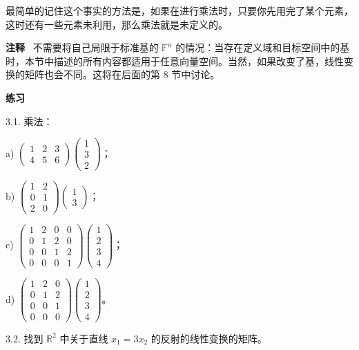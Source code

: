 最简单的记住这个事实的方法是，如果在进行乘法时，只要你先用完了某个元素，这时还有一些元素未利用，那么乘法就是未定义的。

\textbf{注释}~ 不需要将自己局限于标准基的 $\mathbb{F}^n$ 的情况：当存在定义域和目标空间中的基时，本节中描述的所有内容都适用于任意向量空间。当然，如果改变了基，线性变换的矩阵也会不同。这将在后面的第 8 节中讨论。


\textbf{练习}~

3.1. 乘法：

a) $\begin{pmatrix} 1 & 2 & 3 \\ 4 & 5 & 6 \end{pmatrix} \begin{pmatrix} 1 \\ 3 \\ 2 \end{pmatrix}$；

b) $\begin{pmatrix} 1 & 2 \\ 0 & 1 \\ 2 & 0 \end{pmatrix} \begin{pmatrix} 1 \\ 3 \end{pmatrix}$；

c) $\begin{pmatrix} 1 & 2 & 0 & 0 \\ 0 & 1 & 2 & 0 \\ 0 & 0 & 1 & 2 \\ 0 & 0 & 0 & 1 \end{pmatrix} \begin{pmatrix} 1 \\ 2 \\ 3 \\ 4 \end{pmatrix}$；

d) $\begin{pmatrix} 1 & 2 & 0 \\ 0 & 1 & 2 \\ 0 & 0 & 1 \\ 0 & 0 & 0 \end{pmatrix} \begin{pmatrix} 1 \\ 2 \\ 3 \\ 4 \end{pmatrix}$。

3.2. 找到 $\mathbb{R}^2$ 中关于直线 $x_1 = 3x_2$ 的反射的线性变换的矩阵。

